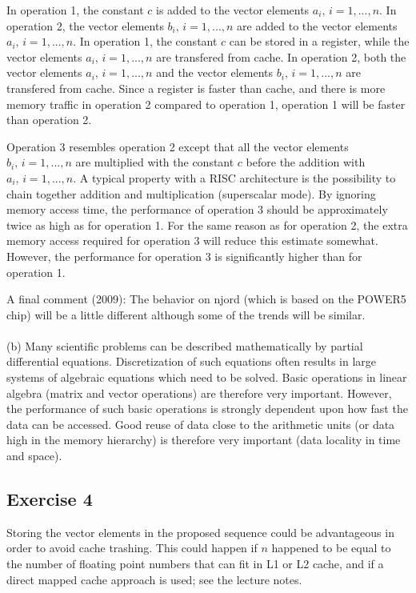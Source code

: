 \documentclass[11pt]{article}
\begin{document}
In operation 1, the constant $c$ is added to the 
vector elements $a_i,\, i=1,...,n$. In operation 2, the 
vector elements $b_i,\, i=1,...,n$ are added to the vector elements 
$a_i,\, i=1,...,n$. In operation 1, the constant $c$ can be stored 
in a register, while the vector elements $a_i,\, i=1,...,n$ 
are transfered from cache. In operation 2, both the vector elements
$a_i,\, i=1,...,n$ and the vector elements $b_i,\, i=1,...,n$
are transfered from cache. Since a register is 
faster than cache, and there is more memory traffic in operation 2 
compared to operation 1, operation 1 will be faster than operation 2.

Operation 3 resembles operation 2 except that all the vector
elements $b_i,\,i=1,...,n$ are multiplied with the constant $c$
before the addition with $a_i,\, i=1,...,n$. 
A typical property with a RISC architecture is the possibility 
to chain together addition and multiplication 
(superscalar mode). By ignoring memory access time, 
the performance of operation 3 should be approximately twice as 
high as for operation 1. For the same reason as for operation 2,
the extra memory access required for operation 3 will reduce
this estimate somewhat. However, the performance for operation 3 
is significantly higher than for operation 1.

A final comment (2009): The behavior on njord (which is based on the POWER5 chip) 
will be a little different although some of the trends will be similar. 
\\
\\
(b) Many scientific problems can be described mathematically by 
partial differential equations. Discretization of such equations
often results in large systems of algebraic equations which need to 
be solved. Basic operations in linear algebra (matrix and vector
operations) are therefore very important. However, the performance 
of such basic operations is strongly dependent upon how fast
the data can be accessed.  Good reuse of data close to the 
arithmetic units (or data high in the memory hierarchy) is therefore
very important (data locality in time and space).


\subsection*{Exercise 4}

Storing the vector elements in the proposed sequence could be 
advantageous in order to avoid cache trashing. 
This could happen if $n$ happened to be equal to the 
number of floating point numbers that can fit in L1 or L2 cache, 
and if a direct mapped cache approach is used; see the lecture notes. 
\end{document}
